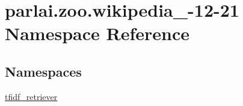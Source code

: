 \hypertarget{namespaceparlai_1_1zoo_1_1wikipedia__2016-12-21}{}\section{parlai.\+zoo.\+wikipedia\+\_-\/12-\/21 Namespace Reference}
\label{namespaceparlai_1_1zoo_1_1wikipedia__2016-12-21}
\subsection*{Namespaces}
\begin{DoxyCompactItemize}
\item 
 \hyperlink{namespaceparlai_1_1zoo_1_1wikipedia__2016-12-21_1_1tfidf__retriever}{tfidf\+\_\+retriever}
\end{DoxyCompactItemize}
